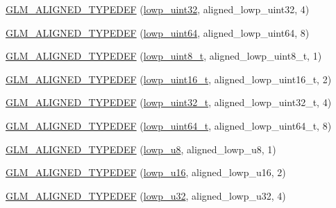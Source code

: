 \begin{DoxyCompactItemize}
\item 
\hyperlink{group__gtx__type__aligned_ga7a5009a1d0196bbf21dd7518f61f0249}{G\+L\+M\+\_\+\+A\+L\+I\+G\+N\+E\+D\+\_\+\+T\+Y\+P\+E\+D\+E\+F} (\hyperlink{group__gtc__type__precision_gaf11e85af414720b4cd12bd57b3a81e68}{lowp\+\_\+uint32}, aligned\+\_\+lowp\+\_\+uint32, 4)
\item 
\hyperlink{group__gtx__type__aligned_ga45213fd18b3bb1df391671afefe4d1e7}{G\+L\+M\+\_\+\+A\+L\+I\+G\+N\+E\+D\+\_\+\+T\+Y\+P\+E\+D\+E\+F} (\hyperlink{group__gtc__type__precision_gacf666a9d9b309c4615c7a4f2ab0be289}{lowp\+\_\+uint64}, aligned\+\_\+lowp\+\_\+uint64, 8)
\item 
\hyperlink{group__gtx__type__aligned_ga0ba26b4e3fd9ecbc25358efd68d8a4ca}{G\+L\+M\+\_\+\+A\+L\+I\+G\+N\+E\+D\+\_\+\+T\+Y\+P\+E\+D\+E\+F} (\hyperlink{group__gtc__type__precision_ga0910ef24195d1b8b26e34d73148c0c45}{lowp\+\_\+uint8\+\_\+t}, aligned\+\_\+lowp\+\_\+uint8\+\_\+t, 1)
\item 
\hyperlink{group__gtx__type__aligned_gaf2b58f5fb6d4ec8ce7b76221d3af43e1}{G\+L\+M\+\_\+\+A\+L\+I\+G\+N\+E\+D\+\_\+\+T\+Y\+P\+E\+D\+E\+F} (\hyperlink{group__gtc__type__precision_ga9a71176a4e5bc61951f9e9197d9c80e1}{lowp\+\_\+uint16\+\_\+t}, aligned\+\_\+lowp\+\_\+uint16\+\_\+t, 2)
\item 
\hyperlink{group__gtx__type__aligned_gadc246401847dcba155f0699425e49dcd}{G\+L\+M\+\_\+\+A\+L\+I\+G\+N\+E\+D\+\_\+\+T\+Y\+P\+E\+D\+E\+F} (\hyperlink{group__gtc__type__precision_ga9f8cb602a358e1f48bda2682cf051f0c}{lowp\+\_\+uint32\+\_\+t}, aligned\+\_\+lowp\+\_\+uint32\+\_\+t, 4)
\item 
\hyperlink{group__gtx__type__aligned_gaace64bddf51a9def01498da9a94fb01c}{G\+L\+M\+\_\+\+A\+L\+I\+G\+N\+E\+D\+\_\+\+T\+Y\+P\+E\+D\+E\+F} (\hyperlink{group__gtc__type__precision_gabf3069d4f188557a87b1d7f35eb0a270}{lowp\+\_\+uint64\+\_\+t}, aligned\+\_\+lowp\+\_\+uint64\+\_\+t, 8)
\item 
\hyperlink{group__gtx__type__aligned_gad7bb97c29d664bd86ffb1bed4abc5534}{G\+L\+M\+\_\+\+A\+L\+I\+G\+N\+E\+D\+\_\+\+T\+Y\+P\+E\+D\+E\+F} (\hyperlink{group__gtc__type__precision_gae63f942c49a30dbf266b2f13f3efe257}{lowp\+\_\+u8}, aligned\+\_\+lowp\+\_\+u8, 1)
\item 
\hyperlink{group__gtx__type__aligned_ga404bba7785130e0b1384d695a9450b28}{G\+L\+M\+\_\+\+A\+L\+I\+G\+N\+E\+D\+\_\+\+T\+Y\+P\+E\+D\+E\+F} (\hyperlink{group__gtc__type__precision_ga22c5364f27caa0a6eb0627cbc21e46be}{lowp\+\_\+u16}, aligned\+\_\+lowp\+\_\+u16, 2)
\item 
\hyperlink{group__gtx__type__aligned_ga31ba41fd896257536958ec6080203d2a}{G\+L\+M\+\_\+\+A\+L\+I\+G\+N\+E\+D\+\_\+\+T\+Y\+P\+E\+D\+E\+F} (\hyperlink{group__gtc__type__precision_gaba06fae1dd98ca50c017e68345df0365}{lowp\+\_\+u32}, aligned\+\_\+lowp\+\_\+u32, 4)

\end{DoxyCompactItemize}
